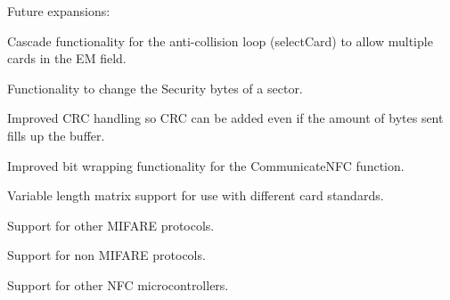 Future expansions\+:
\begin{DoxyItemize}
\item Cascade functionality for the anti-\/collision loop (select\+Card) to allow multiple cards in the EM field.
\item Functionality to change the Security bytes of a sector.
\item Improved C\+RC handling so C\+RC can be added even if the amount of bytes sent fills up the buffer.
\item Improved bit wrapping functionality for the Communicate\+N\+FC function.
\item Variable length matrix support for use with different card standards.
\item Support for other M\+I\+F\+A\+RE protocols.
\item Support for non M\+I\+F\+A\+RE protocols.
\item Support for other N\+FC microcontrollers. 
\end{DoxyItemize}